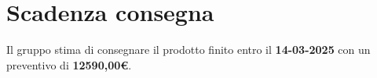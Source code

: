 \section{Scadenza consegna}

Il gruppo stima di consegnare il prodotto finito entro il \textbf{14-03-2025} con un preventivo di \textbf{12590,00\euro}.